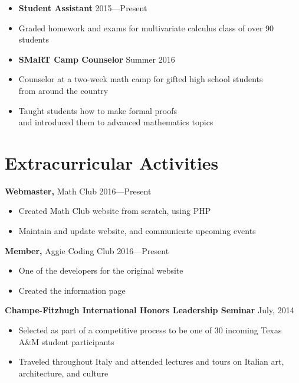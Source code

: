 \documentclass[resmargin, line]{res}
\begin{document}
\begin{resume}
\begin{itemize}
    \item[] {\bf Student Assistant} \hfill 2015---Present
    \item Graded homework and exams for multivariate calculus class of over 90 students

    \item[] {\bf SMaRT Camp Counselor} \hfill Summer 2016
    \item  Counselor at a two-week math camp for gifted high school students \\ from around the country
    \item Taught students how to make formal proofs \\ and introduced them to advanced mathematics topics
\end{itemize}


\section{Extracurricular Activities} 
{\bf Webmaster,} Math Club \hfill 2016---Present
\begin{itemize} \itemsep -2pt
    \item Created Math Club website from scratch, using PHP
    \item Maintain and update website, and communicate upcoming events
\end{itemize}

{\bf Member,} Aggie Coding Club \hfill 2016---Present
\begin{itemize} \itemsep -2pt
    \item One of the developers for the original website 
    \item Created the information page
\end{itemize}

{\bf Champe-Fitzhugh International Honors Leadership Seminar} \hfill July, 2014
\begin{itemize} \itemsep -2pt
    \item Selected as part of a competitive process to be one of 30 incoming Texas A\&M student participants
    \item Traveled throughout Italy and attended lectures and tours on Italian art, architecture, and culture
\end{itemize}



\end{resume}
\end{document}
